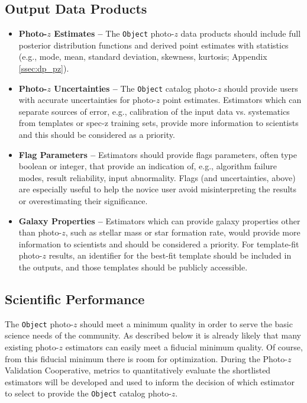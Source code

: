 \documentclass[DM,authoryear,toc]{lsstdoc}
\begin{document}
\subsection{Output Data Products} 
\begin{itemize}
\item \textbf{Photo-$z$ Estimates -- } 
The {\tt Object} photo-$z$ data products should include full posterior distribution functions and derived point estimates with statistics (e.g., mode, mean, standard deviation, skewness, kurtosis; Appendix \ref{ssec:dp_pz}).
\item \textbf{Photo-$z$ Uncertainties -- }
The {\tt Object} catalog photo-$z$ should provide users with accurate uncertainties for photo-$z$ point estimates.
Estimators which can separate sources of error, e.g., calibration of the input data vs. systematics from templates or spec-z training sets, provide more information to scientists and this should be considered as a priority.
\item \textbf{Flag Parameters -- }
Estimators should provide flags parameters, often type boolean or integer, that provide an indication of, e.g., algorithm failure modes, result reliability, input abnormality.
Flags (and uncertainties, above) are especially useful to help the novice user avoid misinterpreting the results or overestimating their significance.
\item \textbf{Galaxy Properties -- }
Estimators which can provide galaxy properties other than photo-$z$, such as stellar mass or star formation rate, would provide more information to scientists and should be considered a priority.
For template-fit photo-$z$ results, an identifier for the best-fit template should be included in the outputs, and those templates should be publicly accessible.
\end{itemize}

\subsection{Scientific Performance}

The {\tt Object} photo-$z$ should meet a minimum quality in order to serve the basic science needs of the community.
As described below it is already likely that many existing photo-$z$ estimators can easily meet a fiducial minimum quality.
Of course, from this fiducial minimum there is room for optimization.
During the Photo-$z$ Validation Cooperative, metrics to quantitatively evaluate the shortlisted estimators will be developed and used to inform the decision of which estimator to select to provide the {\tt Object} catalog photo-$z$.
\end{document}
